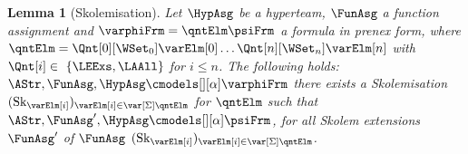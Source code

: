 \documentclass[authoryear]{elsarticle}
\newtheorem{lemma}{Lemma}
\newcommand{\SkolemizedSOF}{\text{Sk}}
\begin{document}
\begin{lemma}[\Meta Skolemisation]
	\label{lmm:MetaSkol}
	Let $\HypAsg$ be a hyperteam, $\FunAsg$ a function assignment and $\varphiFrm
  = \qntElm \psiFrm$ a \Meta formula in prenex form, where $\qntElm =
  \Qnt[0][\WSet_0]\varElm[0] \ldots \Qnt[n][\WSet_n]\varElm[n]$ with $\Qnt[i]
  \in \{\LEExs, \LAAll\}$ for $i\leq n$. The following holds: $\AStr, \FunAsg,
  \HypAsg \cmodels[][\alpha] \varphiFrm$ \iff there exists a Skolemisation
  $(\SkolemizedSOF_{\varElm[i]})_{\varElm[i]\in \var[{\Sigma}]{\qntElm}}$ for $\qntElm$ such
  that $\AStr,\FunAsg', \HypAsg \cmodels[][\alpha] \psiFrm$, for all Skolem
  extensions $\FunAsg'$ of $\FunAsg$ \wrt $(\SkolemizedSOF_{\varElm[i]})_{\varElm[i]\in
    \var[{\Sigma}]{\qntElm}}$.
\end{lemma}


\end{document}
